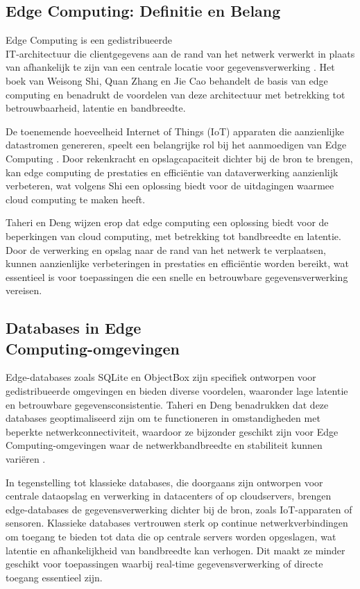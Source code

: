 \subsection{Edge Computing: Definitie en Belang}

Edge Computing is een gedistribueerde \\IT-architectuur die clientgegevens aan de rand van het netwerk verwerkt in plaats van afhankelijk te zijn van een centrale locatie voor gegevensverwerking \autocite{Shi2018}.
 Het boek van Weisong Shi, Quan Zhang en Jie Cao behandelt de basis van edge computing en benadrukt de voordelen van deze architectuur met betrekking tot betrouwbaarheid, latentie en bandbreedte.

De toenemende hoeveelheid Internet of Things (IoT) apparaten die aanzienlijke datastromen genereren, speelt een belangrijke rol bij het aanmoedigen van Edge Computing \autocite{Shi2016}.
 Door rekenkracht en opslagcapaciteit dichter bij de bron te brengen, kan edge computing de prestaties en efficiëntie van dataverwerking aanzienlijk verbeteren, wat volgens Shi een oplossing biedt voor de uitdagingen waarmee cloud computing te maken heeft.

Taheri en Deng wijzen erop dat edge computing een oplossing biedt voor de beperkingen van cloud computing, met betrekking tot bandbreedte en latentie. 
 Door de verwerking en opslag naar de rand van het netwerk te verplaatsen, kunnen aanzienlijke verbeteringen in prestaties en efficiëntie worden bereikt, wat essentieel is voor toepassingen die een snelle en betrouwbare gegevensverwerking vereisen.
 
\subsection{Databases in Edge \vspace{0em}\\ Computing-omgevingen}

Edge-databases zoals SQLite en ObjectBox zijn specifiek ontworpen voor gedistribueerde omgevingen en bieden diverse voordelen, waaronder lage latentie en betrouwbare gegevensconsistentie.
 Taheri en Deng benadrukken dat deze databases geoptimaliseerd zijn om te functioneren in omstandigheden met beperkte netwerkconnectiviteit, waardoor ze bijzonder geschikt zijn voor Edge Computing-omgevingen waar de netwerkbandbreedte en stabiliteit kunnen variëren \autocite{Taheri2020}.

In tegenstelling tot klassieke databases, die doorgaans zijn ontworpen voor centrale dataopslag en verwerking in datacenters of op cloudservers, brengen edge-databases de gegevensverwerking dichter bij de bron, zoals IoT-apparaten of sensoren.
 Klassieke databases vertrouwen sterk op continue netwerkverbindingen om toegang te bieden tot data die op centrale servers worden opgeslagen, wat latentie en afhankelijkheid van bandbreedte kan verhogen.
Dit maakt ze minder geschikt voor toepassingen waarbij real-time gegevensverwerking of directe toegang essentieel zijn.


